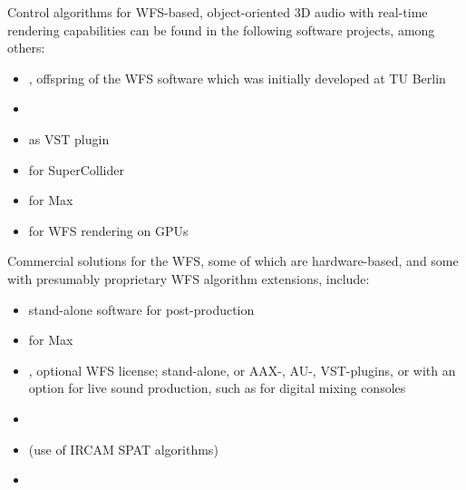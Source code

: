 Control algorithms for WFS-based, object-oriented 3D audio with real-time
rendering capabilities can be found in the following software projects,
among others:
\begin{itemize}
\item \cite{url:wonder}, \cite{url:wonder_lite} offspring of the WFS software
which was initially developed at TU Berlin  %
\item \cite{url:ssr} %
\item \cite{url:iem-wfs} as VST plugin
\item \cite{url:wfscollider} for SuperCollider %
\item \cite{url:wfs-diy} for Max %
\item \cite{Belloch2016_IEEE} for WFS rendering on GPUs
\end{itemize}
%
Commercial solutions for the WFS, some of which are hardware-based,
and some with presumably proprietary WFS algorithm extensions, include:
\begin{itemize}
\item \cite{url:panoramix} stand-alone software for post-production
\item \cite{url:spat_revolution} for Max %
\item \cite{url:flux_spat_revolution}, optional WFS license; stand-alone,
or AAX-, AU-, VST-plugins, or with an option for live sound production,
such as for digital mixing consoles %
\item \cite{url:iosono} %
\item \cite{url:amadeus_holophonix} (use of IRCAM SPAT algorithms) %
\item \cite{url:holoplot} %
\end{itemize}



